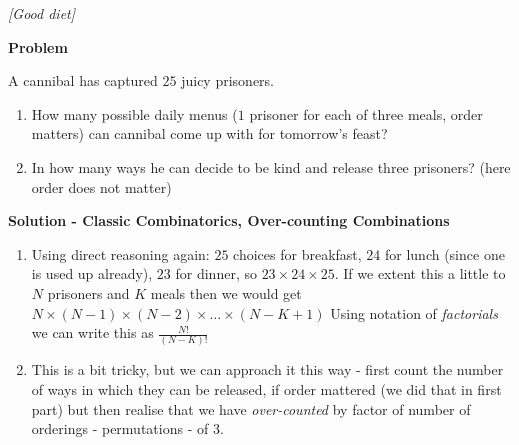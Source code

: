 \begin{problem}
\textit{[Good diet]}

\textbf{Problem}

A cannibal has captured $25$ juicy prisoners.
\begin{enumerate}
\item How many possible daily menus ($1$ prisoner for each of three meals, order matters) can cannibal come up with for tomorrow's feast?
\item In how many ways he can decide to be kind and release three prisoners? (here order does not matter)
\end{enumerate}

\textbf{Solution - Classic Combinatorics, Over-counting Combinations}

\begin{enumerate}
\item Using direct reasoning again: $25$ choices for breakfast, $24$ for lunch (since one is used up already), $23$ for dinner, so $23\times24\times25$. If we extent this a little to $N$ prisoners and $K$ meals then we would get $N\times (N-1) \times (N-2) \times \dots \times (N-K+1)$ Using notation of \textit{factorials} we can write this as $\frac{N!}{(N-K)!}$ 
\item This is a bit tricky, but we can approach it this way - first count the number of ways in which they can be released, if order mattered (we did that in first part) but then realise that we have \textit{over-counted} by factor of number of orderings - permutations - of $3$. 
\end{enumerate}

\end{problem}
%
\filbreak
